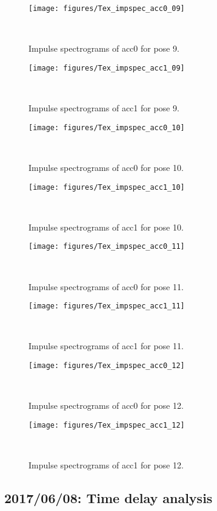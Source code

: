 \documentclass{sigchi}
\begin{document}
\begin{figure*}
  \centering
  \texttt{[image: figures/Tex\_impspec\_acc0\_09]}
  \caption{Impulse spectrograms of acc0 for pose 9.}
    ~\label{fig:Tex_impspec_acc0_09}
\end{figure*}

\begin{figure*}
  \centering
  \texttt{[image: figures/Tex\_impspec\_acc1\_09]}
  \caption{Impulse spectrograms of acc1 for pose 9.}
    ~\label{fig:Tex_impspec_acc1_09}
\end{figure*}

\begin{figure*}
  \centering
  \texttt{[image: figures/Tex\_impspec\_acc0\_10]}
  \caption{Impulse spectrograms of acc0 for pose 10.}
    ~\label{fig:Tex_impspec_acc0_10}
\end{figure*}

\begin{figure*}
  \centering
  \texttt{[image: figures/Tex\_impspec\_acc1\_10]}
  \caption{Impulse spectrograms of acc1 for pose 10.}
    ~\label{fig:Tex_impspec_acc1_10}
\end{figure*}

\begin{figure*}
  \centering
  \texttt{[image: figures/Tex\_impspec\_acc0\_11]}
  \caption{Impulse spectrograms of acc0 for pose 11.}
    ~\label{fig:Tex_impspec_acc0_11}
\end{figure*}

\begin{figure*}
  \centering
  \texttt{[image: figures/Tex\_impspec\_acc1\_11]}
  \caption{Impulse spectrograms of acc1 for pose 11.}
    ~\label{fig:Tex_impspec_acc1_11}
\end{figure*}
\begin{figure*}
  \centering
  \texttt{[image: figures/Tex\_impspec\_acc0\_12]}
  \caption{Impulse spectrograms of acc0 for pose 12.}
    ~\label{fig:Tex_impspec_acc0_12}
\end{figure*}

\begin{figure*}
  \centering
  \texttt{[image: figures/Tex\_impspec\_acc1\_12]}
  \caption{Impulse spectrograms of acc1 for pose 12.}
    ~\label{fig:Tex_impspec_acc1_12}
\end{figure*}


\subsection{2017/06/08: Time delay analysis}
\end{document}

